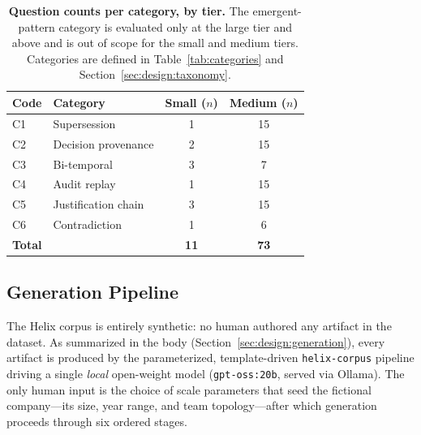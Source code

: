 \begin{table}[t]
  \centering
  \caption{\textbf{Question counts per category, by tier.} The emergent-pattern
    category is evaluated only at the large tier and above and is out of scope
    for the small and medium tiers. Categories are defined in
    Table~\ref{tab:categories} and Section~\ref{sec:design:taxonomy}.}
  \label{tab:design:counts}
  \begin{tabular}{l l c c}
    \toprule
    Code & Category & Small ($n$) & Medium ($n$) \\
    \midrule
    C1           & Supersession        & 1  & 15 \\
    C2           & Decision provenance & 2  & 15 \\
    C3           & Bi-temporal         & 3  & 7  \\
    C4           & Audit replay        & 1  & 15 \\
    C5           & Justification chain & 3  & 15 \\
    C6           & Contradiction       & 1  & 6  \\
    \midrule
    \multicolumn{2}{l}{\textbf{Total}} & \textbf{11} & \textbf{73} \\
    \bottomrule
  \end{tabular}
\end{table}

\subsection{Generation Pipeline}
\label{app:construction:pipeline}

The Helix corpus is entirely synthetic: no human authored any artifact in the
dataset. As summarized in the body (Section~\ref{sec:design:generation}), every
artifact is produced by the parameterized, template-driven \texttt{helix-corpus}
pipeline driving a single \emph{local} open-weight model (\texttt{gpt-oss:20b},
served via Ollama). The only human input is the choice of scale parameters that
seed the fictional company---its size, year range, and team topology---after which
generation proceeds through six ordered stages.


